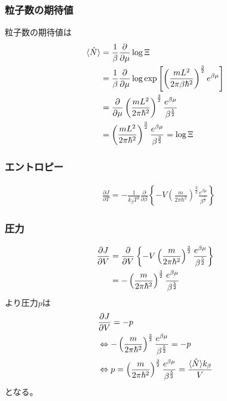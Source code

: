 \documentclass[dvipdfmx, 11pt, a4paper]{jsarticle}
\theoremstyle{definition}
\begin{document}
\subsubsection{粒子数の期待値}
    粒子数の期待値は
    \begin{align}
        \langle \hat{N} \rangle &= \frac{1}{\beta} \frac{\partial }{\partial \mu} \log \Xi \notag \\
        &= \frac{1}{\beta} \frac{\partial }{\partial \mu} \log \exp \left[ \left( \frac{mL^2}{2\pi \beta \hbar^2 } \right)^{\frac{3}{2}} e^{\beta \mu} \right] \notag \\
        &= \frac{\partial }{\partial \mu} \left( \frac{mL^2}{2\pi \hbar^2 } \right)^{\frac{3}{2}} \frac{e^{\beta \mu}}{\beta^{\frac{5}{2}}} \notag \\
        &= \left( \frac{mL^2}{2\pi \hbar^2 } \right)^{\frac{3}{2}} \frac{e^{\beta \mu}}{\beta^{\frac{3}{2}}} = \log \Xi
    \end{align}
\subsubsection{エントロピー}
    \begin{align}
        &\frac{\partial J}{\partial T} = -\frac{1}{k_\beta T^2} \frac{\partial }{\partial \beta} \left\{ -V \left( \frac{m}{2\pi \hbar^2 } \right)^{\frac{3}{2}} \frac{e^{\beta \mu}}{\beta^{\frac{5}{2}}} \right\}
    \end{align}
\subsubsection{圧力}
    \begin{align}
        \frac{\partial J}{\partial V} &= \frac{\partial }{\partial V} \left\{ -V \left( \frac{m}{2\pi \hbar^2 } \right)^{\frac{3}{2}} \frac{e^{\beta \mu}}{\beta^{\frac{5}{2}}} \right\} \notag \\
        &= - \left( \frac{m}{2\pi \hbar^2 } \right)^{\frac{3}{2}} \frac{e^{\beta \mu}}{\beta^{\frac{5}{2}}} \notag \\
    \end{align}
    より圧力$p$は
    \begin{align}
        &\frac{\partial J}{\partial V} = -p \notag \\
        &\Leftrightarrow  - \left( \frac{m}{2\pi \hbar^2 } \right)^{\frac{3}{2}} \frac{e^{\beta \mu}}{\beta^{\frac{5}{2}}}  = -p \notag \\
        &\Leftrightarrow p = \left( \frac{m}{2\pi \hbar^2 } \right)^{\frac{3}{2}} \frac{e^{\beta \mu}}{\beta^{\frac{5}{2}}} = \frac{\langle \hat{N} \rangle k_\beta}{V} 
    \end{align}
    となる。
\end{document}
